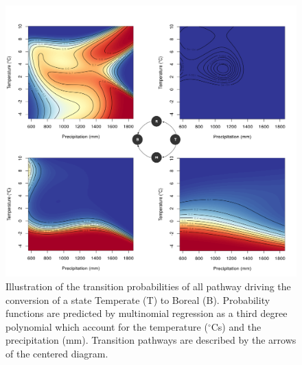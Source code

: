 \vfill

\begin{figure}[h]
  \begin{center}
    \includegraphics[width=\textwidth]{figs/trans_prob_SI.png}
    \caption{Illustration of the transition probabilities of all pathway driving the conversion of a state Temperate (T) to Boreal (B).  Probability functions are predicted by multinomial regression as a third degree polynomial which account for the temperature ($^{\circ}$Cs) and the precipitation (mm). Transition pathways are described by the arrows of the centered diagram.}
    \label{fig:SpaceSI}
  \end{center}
\end{figure}
\clearpage